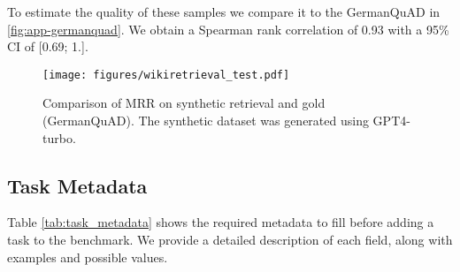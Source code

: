 To estimate the quality of these samples we compare it to the GermanQuAD \citep{möller2021germanquad} in \autoref{fig:app-germanquad}. We obtain a Spearman rank correlation of 0.93 with a 95\% CI of [0.69; 1.].

\begin{figure}
    \centering
    \texttt{[image: figures/wikiretrieval\_test.pdf]}
    \caption{Comparison of MRR on synthetic retrieval and gold (GermanQuAD). The synthetic dataset was generated using GPT4-turbo.}
    \label{fig:app-germanquad}
\end{figure}



\subsection{Task Metadata}\label{appendix:task_metadata}
Table \ref{tab:task_metadata} shows the required metadata to fill before adding a task to the benchmark. We provide a detailed description of each field, along with examples and possible values.

